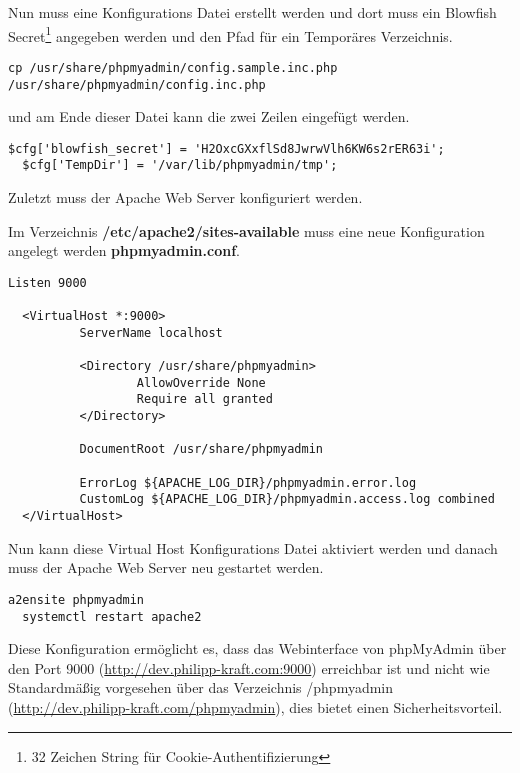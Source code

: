 Nun muss eine Konfigurations Datei erstellt werden und dort muss ein Blowfish
Secret\footnote{32 Zeichen String für Cookie-Authentifizierung} angegeben werden und den Pfad für ein Temporäres Verzeichnis.

\begin{lstlisting}[caption={phpMyAdmin Konfigurationsdatei erstellen}]
  cp /usr/share/phpmyadmin/config.sample.inc.php /usr/share/phpmyadmin/config.inc.php
\end{lstlisting}

und am Ende dieser Datei kann die zwei Zeilen eingefügt werden.

\begin{lstlisting}[caption={phpMyAdmin Blowfish Secret und TempDir}]
  $cfg['blowfish_secret'] = 'H2OxcGXxflSd8JwrwVlh6KW6s2rER63i'; 
  $cfg['TempDir'] = '/var/lib/phpmyadmin/tmp';
\end{lstlisting}

Zuletzt muss der Apache Web Server konfiguriert werden.

Im Verzeichnis \textbf{/etc/apache2/sites-available} muss eine neue
Konfiguration angelegt werden \textbf{phpmyadmin.conf}.

\begin{lstlisting}[caption={phpmyadmin.conf}]
  Listen 9000

  <VirtualHost *:9000>
          ServerName localhost
  
          <Directory /usr/share/phpmyadmin>
                  AllowOverride None
                  Require all granted
          </Directory>
  
          DocumentRoot /usr/share/phpmyadmin
  
          ErrorLog ${APACHE_LOG_DIR}/phpmyadmin.error.log
          CustomLog ${APACHE_LOG_DIR}/phpmyadmin.access.log combined
  </VirtualHost>
\end{lstlisting}

Nun kann diese Virtual Host Konfigurations Datei aktiviert werden und danach
muss der Apache Web Server neu gestartet werden.

\begin{lstlisting}[caption={Virtual Host aktivieren}]
  a2ensite phpmyadmin
  systemctl restart apache2
\end{lstlisting}

Diese Konfiguration
ermöglicht es, dass das Webinterface von phpMyAdmin über den Port 9000 (\url{http://dev.philipp-kraft.com:9000})
erreichbar ist und nicht wie Standardmäßig vorgesehen über das Verzeichnis
/phpmyadmin (\url{http://dev.philipp-kraft.com/phpmyadmin}), dies bietet einen Sicherheitsvorteil.

